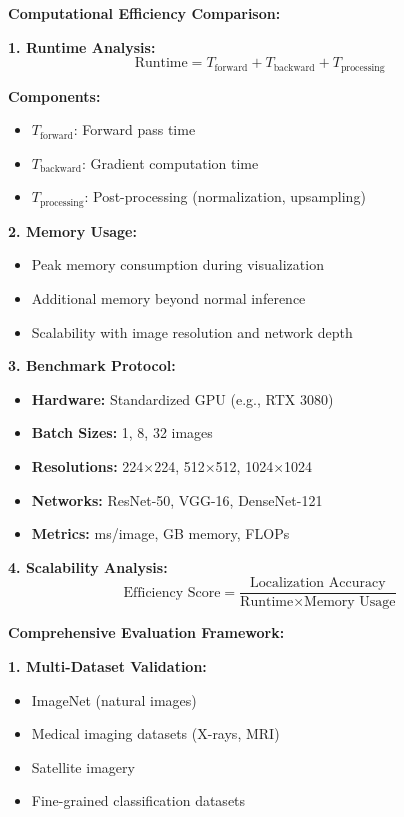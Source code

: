 \documentclass[12pt]{article}
\begin{document}
\begin{enumerate}[(a)]
{    \textbf{Computational Efficiency Comparison:}
    
    \textbf{1. Runtime Analysis:}
    $$\text{Runtime} = T_{\text{forward}} + T_{\text{backward}} + T_{\text{processing}}$$
    
    \textbf{Components:}
    \begin{itemize}
        \item $T_{\text{forward}}$: Forward pass time
        \item $T_{\text{backward}}$: Gradient computation time  
        \item $T_{\text{processing}}$: Post-processing (normalization, upsampling)
    \end{itemize}
    
    \textbf{2. Memory Usage:}
    \begin{itemize}
        \item Peak memory consumption during visualization
        \item Additional memory beyond normal inference
        \item Scalability with image resolution and network depth
    \end{itemize}
    
    \textbf{3. Benchmark Protocol:}
    \begin{itemize}
        \item \textbf{Hardware:} Standardized GPU (e.g., RTX 3080)
        \item \textbf{Batch Sizes:} 1, 8, 32 images
        \item \textbf{Resolutions:} 224×224, 512×512, 1024×1024
        \item \textbf{Networks:} ResNet-50, VGG-16, DenseNet-121
        \item \textbf{Metrics:} ms/image, GB memory, FLOPs
    \end{itemize}
    
    \textbf{4. Scalability Analysis:}
    $$\text{Efficiency Score} = \frac{\text{Localization Accuracy}}{\text{Runtime} \times \text{Memory Usage}}$$
    
    \textbf{Comprehensive Evaluation Framework:}
    
    \textbf{1. Multi-Dataset Validation:}
    \begin{itemize}
        \item ImageNet (natural images)
        \item Medical imaging datasets (X-rays, MRI)
        \item Satellite imagery
        \item Fine-grained classification datasets
    \end{itemize}
    
}
\end{enumerate}
\end{document}
